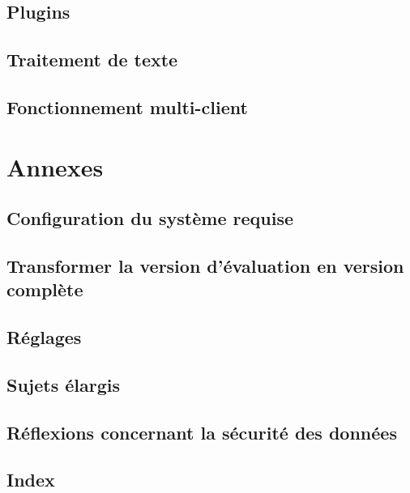 \documentclass[paper=a4,BCOR8.25mm,twoside]{scrbook}
\begin{document}
	
\chapter{Plugins}
	
	
	
	
	
\chapter{Traitement de texte}
	
	
	


\chapter{Fonctionnement multi-client}
	
	
\part{Annexes}
\appendix

\chapter{Configuration du système requise}
	

\chapter{Transformer la version d'évaluation en version complète}
	

\chapter{Réglages}
	

\chapter{Sujets élargis}
    

\chapter{Réflexions concernant la sécurité des données}	
	

\chapter{Index}
\printindex
\end{document}
